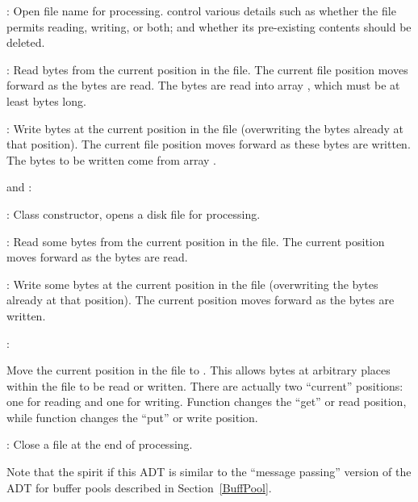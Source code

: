 \begin{itemize}

\item
{}
{: Open file name  for
processing.
 control various details such as whether the file permits
reading, writing, or both; and whether its pre-existing contents
should be deleted.

\item
{}: Read  bytes from the
current position in the file.
The current file position moves forward as the bytes are read.
The bytes are read into array , which must be at least
 bytes long.

\item
{}: Write  bytes at the
current position in the file (overwriting the bytes already at that
position).
The current file position moves forward as these bytes are written.
The bytes to be written come from array .

\item
{} and :}{}
{: Class constructor,
opens a disk file for processing.

\item
{}: Read some bytes from the current position in
the file.
The current position moves forward as the bytes are read.

\item
{}: Write some bytes at the current position in
the file (overwriting the bytes already at that position).
The current position moves forward as the bytes are written.

\item
{}:}{}
Move the current position in the file to .
This allows bytes at arbitrary places within the file to be read or
written.
{There are actually two ``current'' positions: one for reading and one
for writing.
Function  changes the ``get'' or read position,
while function  changes the ``put'' or write position.}{}

\item
{}: Close a file at the end of processing.
\end{itemize}

{Note that the spirit if this ADT is similar to the ``message passing''
version of the ADT for buffer pools described in Section~\ref{BuffPool}.
}{}


